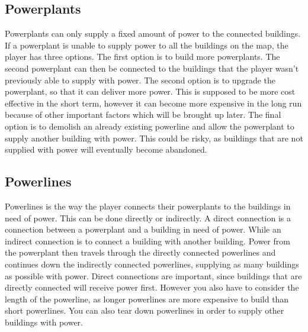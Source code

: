 \subsection*{Powerplants}
    Powerplants can only supply a fixed amount of power to the connected buildings. If a powerplant is 
    unable to supply power to all the buildings on the map, the player has three options. The first option 
    is to build more powerplants. The second powerplant can then be connected to the buildings that the
    player wasn't previously able to supply with power. The second option is to upgrade the powerplant,
    so that it can deliver more power. This is supposed to be more cost effective in the short term, however
    it can become more expensive in the long run because of other important factors which will be brought
    up later. The final option is to demolish an already existing powerline and allow the powerplant to
    supply another building with power. This could be risky, as buildings that are not supplied with power
    will eventually become abandoned.

\subsection*{Powerlines}
    Powerlines is the way the player connects their powerplants to the buildings in need of power. This 
    can be done directly or indirectly. A direct connection is a connection between a powerplant and a 
    building in need of power. While an indirect connection is to connect a building with another building.
    Power from the powerplant then travels through the directly connected powerlines and continues down 
    the indirectly connected powerlines, supplying as many buildings as possible with power. Direct 
    connections are important, since buildings that are directly connected will receive power first.
    However you also have to consider the length of the powerline, as longer powerlines are more expensive
    to build than short powerlines. You can also tear down powerlines in order to supply other buildings
    with power.


